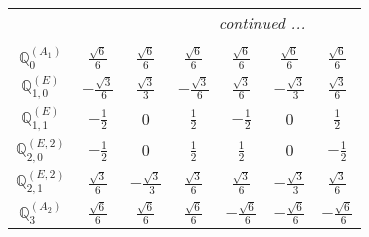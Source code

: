 \documentclass[fleqn,10pt,landscape]{article}
\begin{document}
\begin{itemize}
{\begin{center}
\begin{longtable}{ccccccc}
 \hline \hline
\multicolumn{6}{r}{\footnotesize\it continued ...} \\ \endfoot

 \hline \hline
\multicolumn{6}{r}{} \\ \endlastfoot

$\mathbb{Q}_{0}^{(A_{1})}$ & $ \frac{\sqrt{6}}{6} $ & $ \frac{\sqrt{6}}{6} $ & $ \frac{\sqrt{6}}{6} $ & $ \frac{\sqrt{6}}{6} $ & $ \frac{\sqrt{6}}{6} $ & $ \frac{\sqrt{6}}{6} $ \\ \hline
$\mathbb{Q}_{1,0}^{(E)}$ & $ - \frac{\sqrt{3}}{6} $ & $ \frac{\sqrt{3}}{3} $ & $ - \frac{\sqrt{3}}{6} $ & $ \frac{\sqrt{3}}{6} $ & $ - \frac{\sqrt{3}}{3} $ & $ \frac{\sqrt{3}}{6} $ \\ \hline
$\mathbb{Q}_{1,1}^{(E)}$ & $ - \frac{1}{2} $ & $ 0 $ & $ \frac{1}{2} $ & $ - \frac{1}{2} $ & $ 0 $ & $ \frac{1}{2} $ \\ \hline
$\mathbb{Q}_{2,0}^{(E,2)}$ & $ - \frac{1}{2} $ & $ 0 $ & $ \frac{1}{2} $ & $ \frac{1}{2} $ & $ 0 $ & $ - \frac{1}{2} $ \\ \hline
$\mathbb{Q}_{2,1}^{(E,2)}$ & $ \frac{\sqrt{3}}{6} $ & $ - \frac{\sqrt{3}}{3} $ & $ \frac{\sqrt{3}}{6} $ & $ \frac{\sqrt{3}}{6} $ & $ - \frac{\sqrt{3}}{3} $ & $ \frac{\sqrt{3}}{6} $ \\ \hline
$\mathbb{Q}_{3}^{(A_{2})}$ & $ \frac{\sqrt{6}}{6} $ & $ \frac{\sqrt{6}}{6} $ & $ \frac{\sqrt{6}}{6} $ & $ - \frac{\sqrt{6}}{6} $ & $ - \frac{\sqrt{6}}{6} $ & $ - \frac{\sqrt{6}}{6} $ \\
\end{longtable}
\end{center}
}
\end{itemize}
\end{document}
